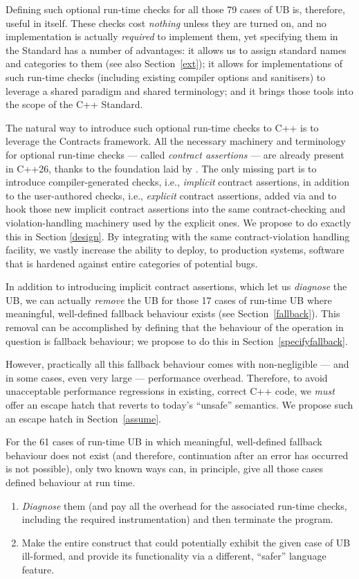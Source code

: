 Defining such optional run-time checks for all those 79 cases of UB is, therefore, useful in itself. These checks cost \emph{nothing} unless they are turned on, and no implementation is actually \emph{required} to implement them, yet specifying them in the Standard has a number of advantages: it allows us to assign standard names and categories to them (see also Section~\ref{ext}); it allows for implementations of such run-time checks (including existing compiler options and sanitisers) to leverage a shared paradigm and shared terminology; and it brings those tools into the scope of the C++ Standard.

The natural way to introduce such optional run-time checks to C++ is to leverage the Contracts framework. All the necessary machinery and terminology for optional run-time checks --- called \emph{contract assertions} --- are already present in C++26, thanks to the foundation laid by \cite{P2900R14}. The only missing part is to introduce compiler-generated checks, i.e., \emph{implicit} contract assertions, in addition to the user-authored checks, i.e., \emph{explicit} contract assertions,  added via \cite{P2900R14} and to hook those new implicit contract assertions into the same contract-checking and violation-handling machinery used by the explicit ones. We propose to do exactly this in Section \ref{design}. By integrating with the same contract-violation handling facility, we vastly increase the ability to deploy, to production systems, software that is hardened against entire categories of potential bugs.

In addition to introducing implicit contract assertions, which let us \emph{diagnose} the UB, we can actually \emph{remove} the UB for those 17 cases of run-time UB where meaningful, well-defined fallback behaviour exists (see Section~\ref{fallback}). This removal can be accomplished by defining that the behaviour of the operation in question is fallback behaviour; we propose to do this in Section~\ref{specifyfallback}.

However, practically all this fallback behaviour comes with non-negligible --- and in some cases, even very large --- performance overhead. Therefore, to avoid unacceptable performance regressions in existing, correct C++ code, we \emph{must} offer an escape hatch that reverts to today's ``unsafe'' semantics. We propose such an escape hatch in Section~\ref{assume}.

For the 61 cases of run-time UB in which meaningful, well-defined fallback behaviour does not exist (and therefore, continuation after an error has occurred is not possible), only two known ways can, in principle, give all those cases defined behaviour at run time.
\begin{enumerate}
\renewcommand{\labelenumi}{\arabic{enumi}.}
\item \emph{Diagnose} them (and pay all the overhead for the associated run-time checks, including the required instrumentation) and then terminate the program.
\item Make the entire construct that could potentially exhibit the given case of UB ill-formed, and provide its functionality via a different, ``safer'' language feature.
\end{enumerate}

